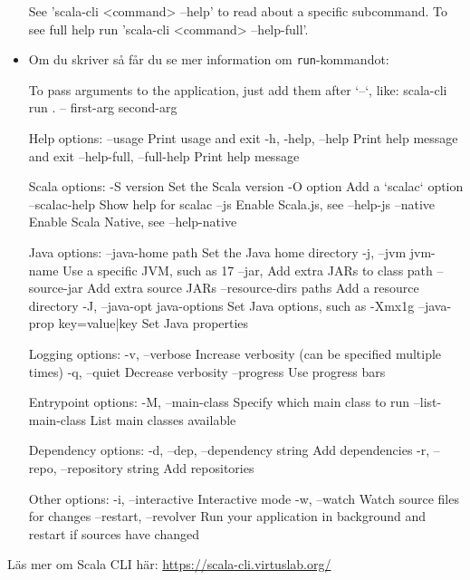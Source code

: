 \begin{itemize}
\begin{REPLsmall}
See 'scala-cli <command> --help' to read about a specific subcommand. 
To see full help run 'scala-cli <command> --help-full'.
\end{REPLsmall}

\item Om du skriver  så får du se mer information om \texttt{run}-kommandot:

\begin{REPLsmall}
To pass arguments to the application, just add them after `--`, like:
scala-cli run . -- first-arg second-arg

Help options:
  --usage                   Print usage and exit
  -h, -help, --help         Print help message and exit
  --help-full, --full-help  Print help message

Scala options:
  -S version      Set the Scala version
  -O option       Add a `scalac` option
  --scalac-help   Show help for scalac
  --js            Enable Scala.js, see --help-js
  --native        Enable Scala Native, see --help-native

Java options:
  --java-home path             Set the Java home directory
  -j, --jvm jvm-name           Use a specific JVM, such as 17
  --jar,                       Add extra JARs to class path
  --source-jar                 Add extra source JARs
  --resource-dirs paths        Add a resource directory
  -J, --java-opt java-options  Set Java options, such as -Xmx1g
  --java-prop key=value|key    Set Java properties

Logging options:
  -v, --verbose  Increase verbosity (can be specified multiple times)
  -q, --quiet    Decrease verbosity
  --progress     Use progress bars

Entrypoint options:
  -M, --main-class    Specify which main class to run
  --list-main-class   List main classes available 

Dependency options:
  -d, --dep, --dependency string   Add dependencies
  -r, --repo, --repository string  Add repositories

Other options:
  -i, --interactive       Interactive mode
  -w, --watch             Watch source files for changes
  --restart, --revolver   Run your application in background 
                          and restart if sources have changed
\end{REPLsmall}

\end{itemize}



Läs mer om Scala CLI här: \url{https://scala-cli.virtuslab.org/}


